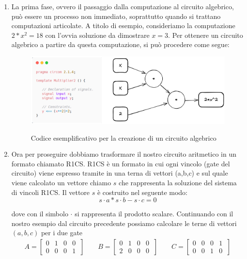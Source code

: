 \begin{enumerate}
    \item  La prima fase, ovvero il passaggio dalla computazione al circuito algebrico, può essere un processo non immediato,
    soprattutto quando si trattano computazioni articolate. A titolo di esempio, consideriamo la computazione $2*x^2=18$ con
    l'ovvia soluzione da dimostrare $x=3$. Per ottenere un circuito algebrico a partire da questa computazione, si può
    procedere come segue:\clearpage
        
    \begin{figure}[H]
        \centering
        \includegraphics[width=13cm]{./chapters/1.state-of-art/images/9.comp_circ.png}
        \label{fig:comp-circ}
        \captionsetup{justification=centering}
        \caption{Codice esemplificativo per la creazione di un circuito algebrico}
    \end{figure}

    \item  Ora per proseguire dobbiamo trasformare il nostro circuito aritmetico in un formato chiamato R1CS. R1CS è un
    formato in cui ogni vincolo (gate del circuito) viene espresso tramite in una terna di vettori (a,b,c) e sul quale viene
    calcolato un vettore chiamo $s$ che rappresenta la soluzione del sistema di vincoli R1CS. Il vettore $s$ è
    costruito nel seguente modo:
    $$
    s \cdot a * s \cdot  b - s \cdot  c = 0
    $$
    
    dove con il simbolo $\cdot$  si rappresenta il prodotto scalare. Continuando con il nostro esempio dal circuito
    precedente possiamo calcolare le terne di vettori $(a,b,c)$ per i due gate
    \begin{gather*}
        A =
        \begin{bmatrix}
        0 & 1 & 0 & 0 \\
        0 & 0 & 0 & 1 \
        \end{bmatrix}
        \qquad
        B =
        \begin{bmatrix}
        0 & 1 & 0 & 0 \\
        2 & 0 & 0 & 0 \
        \end{bmatrix}
        \qquad
        C =
        \begin{bmatrix}
        0 & 0 & 0 & 1 \\
        0 & 0 & 1 & 0 \
        \end{bmatrix}
    \end{gather*}
        

\end{enumerate}
